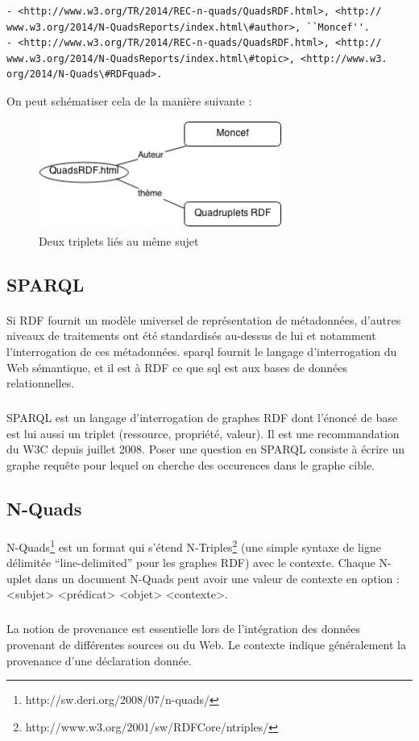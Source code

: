 \begin{verbatim}
- <http://www.w3.org/TR/2014/REC-n-quads/QuadsRDF.html>, <http://
www.w3.org/2014/N-QuadsReports/index.html\#author>, ``Moncef''.
- <http://www.w3.org/TR/2014/REC-n-quads/QuadsRDF.html>, <http://
www.w3.org/2014/N-QuadsReports/index.html\#topic>, <http://www.w3.
org/2014/N-Quads\#RDFquad>.
\end{verbatim}
On peut schématiser cela de la manière suivante :
\begin{figure}[H]
\centering
\centering
\includegraphics[width=8cm]{Diag.png}
\caption{Deux triplets liés au même sujet}
\end{figure}
\newpage
\subsection{SPARQL}
\paragraph{}
Si RDF fournit un modèle universel de représentation de métadonnées, d'autres niveaux de traitements ont été standardisés au-dessus de lui et notamment l'interrogation de ces métadonnées. 
\gls{sparql} fournit le langage d'interrogation du Web sémantique, et il est à RDF ce que \gls{sql} est aux bases de données relationnelles.
\subparagraph{}
SPARQL est un langage d'interrogation de graphes RDF dont l'énoncé de base est lui aussi un triplet (ressource, propriété, valeur). Il est une recommandation du W3C depuis juillet 2008.
Poser une question en SPARQL consiste à écrire un graphe requête pour lequel on cherche des occurences dans le graphe cible.
\subsection{N-Quads}
\paragraph{}
N-Quads\footnote{http://sw.deri.org/2008/07/n-quads/} est un format qui s'étend N-Triples\footnote{http://www.w3.org/2001/sw/RDFCore/ntriples/} (une simple syntaxe de ligne délimitée ``line-delimited'' pour les graphes RDF) avec le contexte. Chaque N-uplet dans un document N-Quads peut avoir une valeur de contexte en option :
<subjet> <prédicat> <objet> <contexte>.
\subparagraph{}
La notion de provenance est essentielle lors de l'intégration des données provenant de différentes sources ou du Web. Le contexte indique généralement la provenance d'une déclaration donnée.
